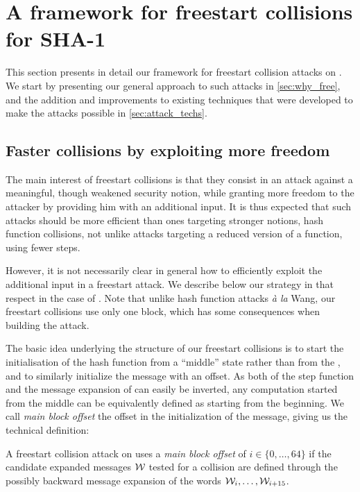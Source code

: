 \section{A framework for freestart collisions for SHA-1}
\label{sec:framework}
This section presents in detail our framework for freestart collision attacks on \shaone. We start by presenting our general approach to such attacks
in \autoref{sec:why_free}, and the addition and improvements to existing techniques that were developed to make the attacks possible in \autoref{sec:attack_techs}.

\subsection{Faster collisions by exploiting more freedom}
\label{sec:why_free}

The main interest of freestart collisions is that they consist in an attack against a meaningful, though weakened security notion, while granting more freedom to
the attacker by providing him with an additional input. It is thus expected that such attacks should be more efficient than ones targeting stronger notions, \eg hash function
collisions, not unlike attacks targeting a reduced version of a function, using fewer steps.

However, it is not necessarily clear in general how to efficiently exploit the additional input in a freestart attack. We describe below our strategy in that respect
in the case of \shaone. Note that unlike hash function attacks \emph{à la} Wang, our freestart collisions use only one block, which has some consequences when
building
the attack.

\medskip

The basic idea underlying the structure of our freestart collisions is to start the initialisation of the hash function from a ``middle'' state rather than from the \iv,
and to similarly initialize the message with an offset. As both of the step function and the message expansion of \shaone can easily be inverted, any computation started
from the middle can be equivalently defined as starting from the beginning. We call \emph{main block offset} the offset in the initialization of the message, giving us
the technical definition:

\begin{defi}
A freestart collision attack on \shaone uses a \emph{main block offset} of $i \in \{0, \ldots, 64\}$ if the candidate expanded messages $\mathcal{W}$ tested for a collision are defined
through the possibly backward message expansion of the words $\mathcal{W}_i, \ldots, \mathcal{W}_{i + 15}$.
\end{defi}

